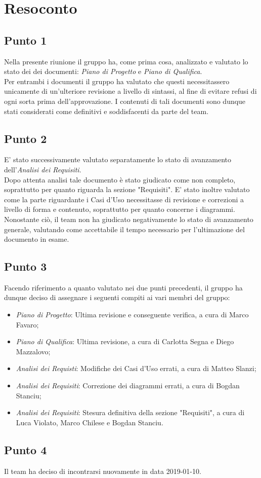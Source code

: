 \section{Resoconto}

\subsection{Punto 1}
Nella presente riunione il gruppo ha, come prima cosa, analizzato e valutato lo stato dei dei documenti: \textit{Piano di Progetto} e \textit{Piano di Qualifica}.\\
Per entrambi i documenti il gruppo ha valutato che questi necessitassero unicamente di un'ulteriore revisione a livello di sintassi, al fine di evitare refusi di ogni sorta prima dell'approvazione. I contenuti di tali documenti sono dunque stati considerati come definitivi e soddisfacenti da parte del team.\\

\subsection{Punto 2}
E' stato successivamente valutato separatamente lo stato di avanzamento dell'\textit{Analisi dei Requisiti}.\\
Dopo attenta analisi tale documento è stato giudicato come non completo, soprattutto per quanto riguarda la sezione "Requisiti". E' stato inoltre valutato come la parte riguardante i Casi d'Uso necessitasse di revisione e correzioni a livello di forma e contenuto, soprattutto per quanto concerne i diagrammi.\\ 
Nonostante ciò, il team non ha giudicato negativamente lo stato di avanzamento generale, valutando come accettabile il tempo necessario per l'ultimazione del documento in esame.

\subsection{Punto 3}
Facendo riferimento a quanto valutato nei due punti precedenti, il gruppo ha dunque deciso di assegnare i seguenti compiti ai vari membri del gruppo:
\begin{itemize}
	\item \textit{Piano di Progetto}: Ultima revisione e conseguente verifica, a cura di Marco Favaro;
	\item \textit{Piano di Qualifica}: Ultima revisione, a cura di Carlotta Segna e Diego Mazzalovo;
	\item \textit{Analisi dei Requisti}: Modifiche dei Casi d'Uso errati, a cura di Matteo Slanzi;
	\item \textit{Analisi dei Requisiti}: Correzione dei diagrammi errati, a cura di Bogdan Stanciu;
	\item \textit{Analisi dei Requisiti}: Stesura definitiva della sezione "Requisiti", a cura di Luca Violato, Marco Chilese e Bogdan Stanciu.
\end{itemize}

\subsection{Punto 4}
Il team ha deciso di incontrarsi nuovamente in data 2019-01-10.

